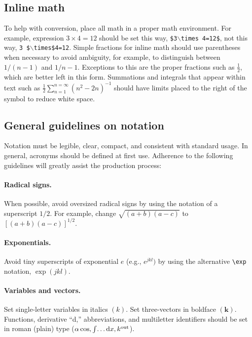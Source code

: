 \documentclass[10pt,letterpaper]{article}
\begin{document}
\subsection{Inline math} To help with conversion, place all math in a proper math environment. For example, expression \mbox{$3\times 4 = 12$} should be set this way, \texttt{\$3$\backslash$times 4=12\$}, not this way, \texttt{3 \$$\backslash$times\$4=12}. Simple fractions for inline math
should use parentheses when necessary to avoid ambiguity, for
example, to distinguish between $1/(n-1)$ and $1/n-1$.  Exceptions
to this are the proper fractions such as $\frac{1}{2}$, which are
better left in this form. Summations and integrals that appear
within text such as $\frac{1}{2}{\sum }_{n=1}^{n=\infty} (n^2 -
2n)^{-1}$ should have limits placed to the right of the symbol to
reduce white space.

\subsection{General guidelines on notation} Notation must be
legible, clear, compact, and consistent with standard usage. In
general, acronyms should be defined at first use. Adherence to the
following guidelines will greatly assist the production process:

\paragraph*{\bf Radical signs.}
When possible, avoid oversized radical signs
by using the notation of a superscript $1/2$. For example, change
$\sqrt{(a + b)(a - c)}$ to $[(a + b)(a - c)]^{1/2}$.

\paragraph*{\bf Exponentials.} Avoid tiny superscripts of exponential $e$ (e.g.,
$e^{jkl})$ by using the alternative \verb+\exp+ notation,
$\exp(jkl)$.

\paragraph*{\bf Variables and vectors.}
Set single-letter variables in italics $(k)$. Set three-vectors in
boldface $(\mathbf{k})$. Functions, derivative ``d,''
abbreviations, and multiletter identifiers should be set in roman
(plain) type  ($\alpha \cos, \int\!\dots{\rm d}x, k^{\rm out}$).
\end{document}
